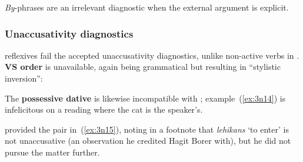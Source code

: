 \begin{exe}
\begin{xlist}
\begin{xlist}
\begin{exe}
\begin{xlist}
\begin{xlist}
\begin{exe}
\begin{xlist}
\begin{xlist}
\begin{exe}
\begin{exe}
\begin{xlist}
\begin{exe}
\begin{exe}
\begin{xlist}
\begin{exe}
\begin{exe}
\emph{By}-phrases are an irrelevant diagnostic when the external argument is explicit.

		\subsubsection{Unaccusativity diagnostics} \label{vz:tnif:figrefl:unacc}
 reflexives fail the accepted unaccusativity diagnostics, unlike non-active verbs in {\tnif}. \textbf{VS order} is unavailable, again being grammatical but resulting in ``stylistic inversion'':
 \begin{exe}
	
 \z 

The \textbf{possessive dative} is likewise incompatible with ; example~(\ref{ex:3n14}) is infelicitous on a reading where the cat is the speaker's.
 \begin{exe}
	
 \z 

\citet[134]{shlonsky87} provided the pair in~(\ref{ex:3n15}), noting in a footnote that \emph{lehikans} `to enter' is not unaccusative (an observation he credited Hagit Borer with), but he did not pursue the matter further.
 \begin{exe}
 \ex  \label{ex:3n15}
 \begin{xlist} 
		
		

\end{xlist}
\end{exe}
\end{exe}
\end{exe}
\end{exe}
\end{exe}
\end{xlist}
\end{exe}
\end{exe}
\end{xlist}
\end{exe}
\end{exe}
\end{xlist}
\end{xlist}
\end{exe}
\end{xlist}
\end{xlist}
\end{exe}
\end{xlist}
\end{xlist}
\end{exe}
